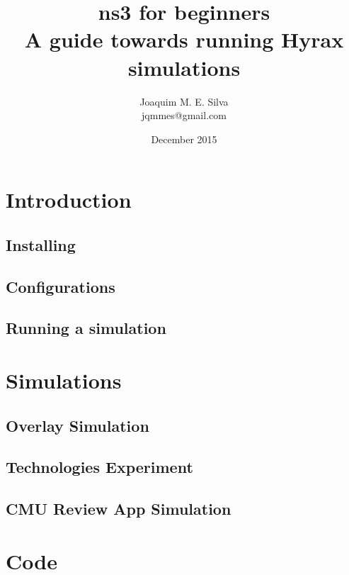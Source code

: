 \documentclass[a4paper]{book}
\begin{document}
\title{{\Huge ns3 for beginners} \\
\vspace{1em}\large A guide towards running Hyrax simulations\vspace{5em}}
\author{Joaquim M. E. Silva \\ jqmmes@gmail.com}
\date{December 2015}
\maketitle

\tableofcontents

\chapter{Introduction}

\section{Installing}

\section{Configurations}

\section{Running a simulation}


\chapter{Simulations}

\section{Overlay Simulation}


\section{Technologies Experiment}


\section{CMU Review App Simulation}


\chapter{Code}
\end{document}
